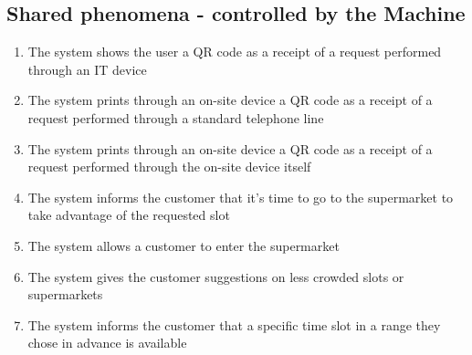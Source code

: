 \documentclass[../../main.tex]{subfiles}
\begin{document}
\subsection{Shared phenomena - controlled by the Machine}

\begin{enumerate}
  \item The system shows the user a QR code as a receipt of a request performed
  through an IT device
  \item The system prints through an on-site device a QR code as a receipt of a
  request performed through a standard telephone line
  \item The system prints through an on-site device a QR code as a receipt of a
  request performed through the on-site device itself
  \item The system informs the customer that it's time to go to the supermarket
  to take advantage of the requested slot
  \item The system allows a customer to enter the supermarket
  \item The system gives the customer suggestions on less crowded slots or
  supermarkets
  \item The system informs the customer that a specific time slot in a range
  they chose in advance is available
\end{enumerate}
\end{document}
